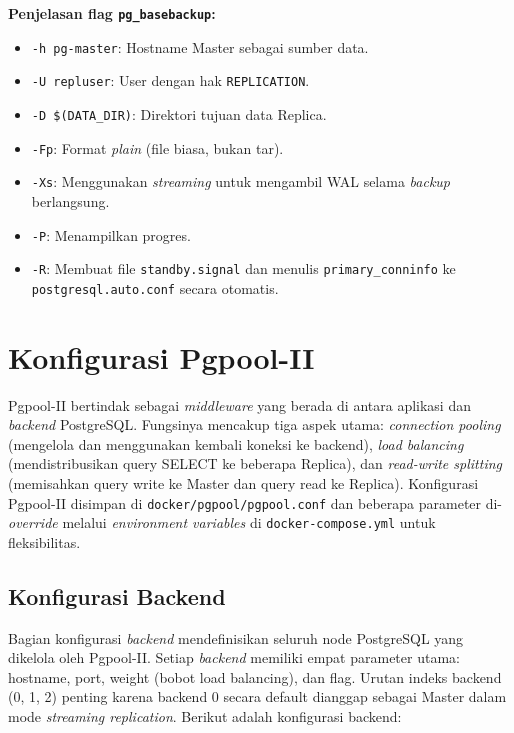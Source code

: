 \textbf{Penjelasan flag \texttt{pg\_basebackup}:}
\begin{itemize}
    \item \texttt{-h pg-master}: Hostname Master sebagai sumber data.
    \item \texttt{-U repluser}: User dengan hak \texttt{REPLICATION}.
    \item \texttt{-D \$(DATA\_DIR)}: Direktori tujuan data Replica.
    \item \texttt{-Fp}: Format \textit{plain} (file biasa, bukan tar).
    \item \texttt{-Xs}: Menggunakan \textit{streaming} untuk mengambil
    WAL selama \textit{backup} berlangsung.
    \item \texttt{-P}: Menampilkan progres.
    \item \texttt{-R}: Membuat file \texttt{standby.signal} dan menulis
    \texttt{primary\_conninfo} ke \texttt{postgresql.auto.conf} secara
    otomatis.
\end{itemize}

\section{Konfigurasi Pgpool-II}

Pgpool-II bertindak sebagai \textit{middleware} yang berada di antara
aplikasi dan \textit{backend} PostgreSQL. Fungsinya mencakup tiga
aspek utama: \textit{connection pooling} (mengelola dan menggunakan
kembali koneksi ke backend), \textit{load balancing} (mendistribusikan
query SELECT ke beberapa Replica), dan \textit{read-write splitting}
(memisahkan query write ke Master dan query read ke Replica).
Konfigurasi Pgpool-II disimpan di \texttt{docker/pgpool/pgpool.conf}
dan beberapa parameter di-\textit{override} melalui \textit{environment
variables} di \texttt{docker-compose.yml} untuk fleksibilitas.

\subsection{Konfigurasi Backend}

Bagian konfigurasi \textit{backend} mendefinisikan seluruh node
PostgreSQL yang dikelola oleh Pgpool-II. Setiap \textit{backend}
memiliki empat parameter utama: hostname, port, weight (bobot load
balancing), dan flag. Urutan indeks backend (0, 1, 2) penting karena
backend 0 secara default dianggap sebagai Master dalam mode
\textit{streaming replication}. Berikut adalah konfigurasi backend:

